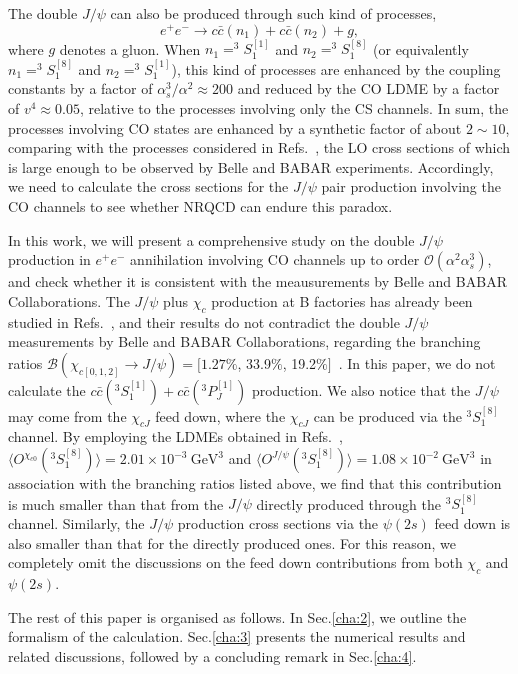 \documentclass[preprint,showpacs,preprintnumbers,amssymb,aps]{revtex4}
\def\be{\begin{equation}}
\def\ee{\end{equation}}
\def\gev{\mathrm{~GeV}}
\begin{document}
The double $J/\psi$ can also be produced through such kind of processes,
\be
e^+e^-\rightarrow c\bar{c}(n_1)+c\bar{c}(n_2)+g, \label{eqn:process2}
\ee
where $g$ denotes a gluon.
When $n_1=^3S_1^{[1]}$ and $n_2=^3S_1^{[8]}$ (or equivalently $n_1=^3S_1^{[8]}$ and $n_2=^3S_1^{[1]}$),
this kind of processes are enhanced by the coupling constants by a factor of $\alpha_s^3/\alpha^2\approx 200$ and reduced by the CO LDME by a factor of $v^4\approx 0.05$,
relative to the processes involving only the CS channels.
In sum, the processes involving CO states are enhanced by a synthetic factor of about $2\sim 10$,
comparing with the processes considered in Refs.~\cite{Bodwin:2002fk, Gong:2008ce},
the LO cross sections of which is large enough to be observed by Belle and BABAR experiments.
Accordingly, we need to calculate the cross sections for the $J/\psi$ pair production involving the CO channels to see whether NRQCD can endure this paradox.

In this work, we will present a comprehensive study on the double $J/\psi$ production in $e^+e^-$ annihilation involving CO channels up to order $\mathcal{O}(\alpha^2\alpha_s^3)$,
and check whether it is consistent with the meausurements by Belle and BABAR Collaborations.
The $J/\psi$ plus $\chi_c$ production at B factories has already been studied in Refs.~\cite{Liu:2002wq, Wang:2011qg, Dong:2011fb},
and their results do not contradict the double $J/\psi$ measurements by Belle and BABAR Collaborations,
regarding the branching ratios $\mathcal{B}(\chi_{c[0,1,2]}\rightarrow J/\psi)=[1.27\%$, 33.9$\%$, 19.2$\%]$~\cite{Agashe:2014kda}.
In this paper, we do not calculate the $c\bar{c}(^3S_1^{[1]})+c\bar{c}(^3P_J^{[1]})$ production.
We also notice that the $J/\psi$ may come from the $\chi_{cJ}$ feed down, where the $\chi_{cJ}$ can be produced via the $^3S_1^{[8]}$ channel.
By employing the LDMEs obtained in Refs.~\cite{Jia:2014jfa, Sun:2015pia},
$\langle O^{\chi_{c0}}(^3S_1^{[8]})\rangle=2.01\times 10^{-3}\gev^3$ and $\langle O^{J/\psi}(^3S_1^{[8]})\rangle=1.08\times 10^{-2}\gev^3$ in association with the branching ratios listed above,
we find that this contribution is much smaller than that from the $J/\psi$ directly produced through the $^3S_1^{[8]}$ channel.
Similarly, the $J/\psi$ production cross sections via the $\psi(2s)$ feed down is also smaller than that for the directly produced ones.
For this reason, we completely omit the discussions on the feed down contributions from both $\chi_c$ and $\psi(2s)$.

The rest of this paper is organised as follows. In Sec.\ref{cha:2}, we outline the formalism of the calculation.
Sec.\ref{cha:3} presents the numerical results and related discussions, followed by a concluding remark in Sec.\ref{cha:4}.
\end{document}
